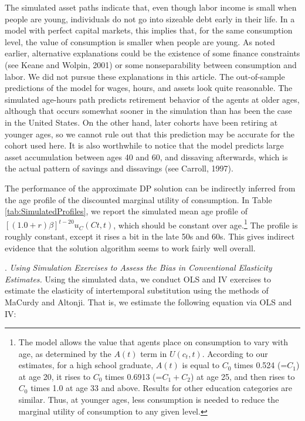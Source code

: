 \documentclass{article}
\begin{document}



The simulated asset paths indicate that, even though labor income is small when people are young, individuals do not go into sizeable debt early in their life. In a model with perfect capital markets, this implies that, for the same consumption level, the value of consumption is smaller when people are young. As noted earlier, alternative explanations could be the existence of some finance constraints (see Keane and Wolpin, 2001) or some nonseparability between consumption and labor. We did not pursue these explanations in this article. The out-of-sample predictions of the model for wages, hours, and assets look quite reasonable. The simulated age-hours path predicts retirement behavior of the agents at older ages, although that occurs somewhat sooner in the simulation than has been the case in the United States. On the other hand, later cohorts have been retiring at younger ages, so we cannot rule out that this prediction may be accurate for the cohort  used here. It is also worthwhile to notice that the model predicts large asset accumulation between ages 40 and 60, and dissaving afterwards, which is the actual pattern of savings and dissavings (see Carroll, 1997). \par
The performance of the approximate DP solution can be indirectly inferred from the age profile of the discounted marginal utility of consumption. In Table \ref{tab:SimulatedProfiles}, we report the simulated mean age profile of $[(1.0 + r)\beta]^{t-20} u_C(Ct, t)$, which should be constant over age.\footnote[11]{The model allows the value that agents place on consumption to vary with age, as determined by the $A(t)$ term in $U(c_t, t)$. According to our estimates, for a high school graduate, $A(t)$ is equal to $C_0$ times 0.524 (=$C_1$) at age 20, it rises to $C_0$ times 0.6913 (=$C_1 + C_2$) at age 25, and then rises to $C_0$ times 1.0 at age 33 and above. Results for other education categories are similar. Thus, at younger ages, less consumption is needed to reduce the marginal utility of consumption to any given level.} The profile is roughly constant, except it rises a bit in the late 50s and 60s. This gives indirect evidence that the solution algorithm seems to work fairly well overall. \par
{}.     \textit{Using Simulation Exercises to Assess the Bias in Conventional Elasticity Estimates.}     Using the simulated data, we conduct OLS and IV exercises to estimate the elasticity of intertemporal substitution using the methods of MaCurdy and Altonji. That is, we estimate the following equation via OLS and IV:
\end{document}

